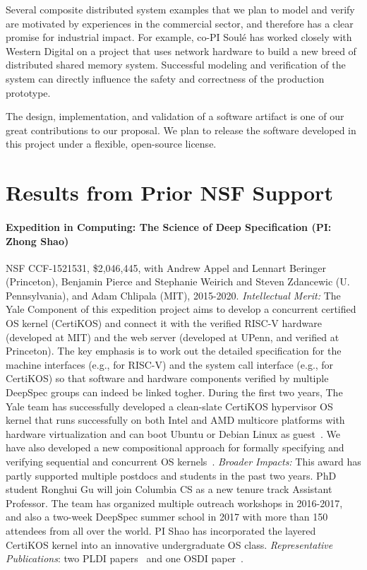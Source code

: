 \documentclass[11pt]{article}
\begin{document}
Several composite distributed system examples that we plan to model
and verify are motivated by experiences in the commercial sector, 
and therefore has a clear promise for industrial impact. 
For example, co-PI Soul\'{e} has worked closely with Western Digital 
on a project that uses network hardware to build a new breed of 
distributed shared memory system. Successful modeling and
verification of the system can directly influence the safety and 
correctness of the production prototype. 

The design, implementation, and validation of a software artifact 
is one of our great contributions to our proposal. 
We plan to release the software developed in this project under 
a flexible, open-source license.


\section{Results from Prior NSF Support}
\label{ssec:prior}

\paragraph{Expedition in Computing: The Science of Deep Specification (PI: Zhong Shao)} 
NSF CCF-1521531, \$2,046,445, with Andrew Appel and Lennart Beringer
(Princeton), Benjamin Pierce and Stephanie Weirich and Steven
Zdancewic (U. Pennsylvania), and Adam Chlipala (MIT), 2015-2020.  {\em
  Intellectual Merit:} The Yale Component of this expedition project
aims to develop a concurrent certified OS kernel (CertiKOS) and
connect it with the verified RISC-V hardware (developed at MIT) and
the web server (developed at UPenn, and verified at Princeton). The
key emphasis is to work out the detailed specification for the machine
interfaces (e.g., for RISC-V) and the system call interface (e.g., for
CertiKOS) so that software and hardware components verified by
multiple DeepSpec groups can indeed be linked togher. During the first
two years, The Yale team has successfully developed a clean-slate
CertiKOS hypervisor OS kernel that runs successfully on both Intel and
AMD multicore platforms with hardware virtualization and can boot
Ubuntu or Debian Linux as guest~\cite{certikos16}.  We have also
developed a new compositional approach for formally specifying and
verifying sequential and concurrent OS
kernels~\cite{chen16,costanzo16,certikos16}.  {\em Broader Impacts:}
This award has partly supported multiple postdocs and students in the
past two years. PhD student Ronghui Gu will join Columbia CS as a new
tenure track Assistant Professor.  The team has organized multiple
outreach workshops in 2016-2017, and also a two-week DeepSpec summer
school in 2017 with more than 150 attendees from all over the
world. PI Shao has incorporated the layered CertiKOS kernel into an
innovative undergraduate OS class.  {\em Representative Publications}:
two PLDI papers~\cite{chen16,costanzo16} and one OSDI
paper~\cite{certikos16}.
\end{document}
